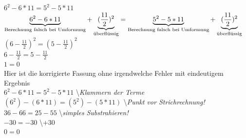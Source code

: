 \documentclass[12pt,a4paper]{article}
\begin{document}
$6^2 - 6 * 11 = 5^2 - 5 * 11$\\
$\underbrace{6^2 - 6 * 11}_{\emph{\emph{Berechnung falsch bei Umformung}}} + \underbrace{(\frac{11}{2})^2}_{\emph{\emph{überflüssig}}} = \underbrace{5^2 - 5 * 11}_{\emph{\emph{Berechnung falsch bei Umformung}}} + \underbrace{(\frac{11}{2})^2}_{\emph{\emph{überflüssig}}}$\\
$(6 - \frac{11}{2})^2 = (5 - \frac{11}{2})^2$\\
$6 - \frac{11}{2} = 5 - \frac{11}{2}$\\
$1 = 0$
\\[2ex]
Hier ist die korrigierte Fassung ohne irgendwelche Fehler mit eindeutigem Ergebnis
\\[2ex]
$6^2 - 6 * 11 = 5^2 - 5 * 11$ \hspace{4cm} \backslash \emph{\emph{Klammern der Terme}}\\ %
$(6^2) - (6 * 11) = (5^2) - (5 * 11)$ \hspace{2.7cm} \backslash \emph{\emph{Punkt vor Strichrechnung!}}\\ %
$36 - 66 = 25 - 55$ \hspace{5.5cm} \backslash \emph{\emph{simples Substrahieren!}}\\ %
$-30 = - 30$ \hspace{6.7cm} \backslash $+ 30$\\ %
$0 = 0$
\end{document}
